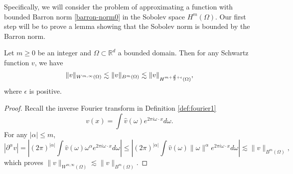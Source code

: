 Specifically, we will consider the problem of approximating a function with bounded Barron norm \eqref{barron-norm0} in the Sobolev space $H^m(\Omega)$. Our first step will be to prove a lemma showing that the Sobolev norm is bounded by the Barron norm.

\begin{lemma}\label{smoothness-lemma}
 Let $m \geq 0$ be an integer and $\Omega\subset \mathbb{R}^d$ a bounded domain. Then for any Schwartz function $v$, we have
 \begin{equation}\label{embend}
 \|v\|_{W^{m,\infty}(\Omega)} \lesssim \|v\|_{{B}^m(\Omega)} \lesssim  \|v\|_{H^{m + {d\over 2}+\epsilon}(\Omega)},
 \end{equation}
 where $\epsilon$ is positive.
\end{lemma}
\begin{proof}
Recall the inverse Fourier transform in Definition \ref{def:fourier1}
$$
v(x)=\int \hat{v}(\omega) e^{2 \pi i\omega \cdot x} d \omega.
$$
For any $|\alpha|\le m$,
$$
|\partial^\alpha v|=|(2\pi)^{|\alpha|}\int \hat{v}(\omega) \omega^\alpha e^{2 \pi i\omega \cdot x} d \omega|\le |(2\pi)^{|\alpha|}\int \hat{v}(\omega) \|\omega\|^\alpha e^{2 \pi i\omega \cdot x} d \omega| \lesssim \|v\|_{B^m(\Omega)},
$$ 
which proves $ \|v\|_{W^{m,\infty}(\Omega)} \lesssim \|v\|_{{B}^m(\Omega)}$.

\iffalse
 Let $\chi$ be a Schwartz function satisfying $\chi(x) = 1$ for $x\in \Omega$. Such a function exists because $\Omega$ is bounded. Let $\alpha$ be any multi-index with $|\alpha|\leq m$. Then we have
 \begin{equation}
  \|D^\alpha v\|_{L^2(\Omega)} \leq \|\chi D^\alpha u\|_{L^2(\mathbb{R}^d)} \leq \|\hat\chi * \widehat{D^\alpha v}\|_{L^2(\mathbb{R}^d)}
 \end{equation}
 Now we use Young's inequality to obtain
 \begin{equation}
  \|\hat\chi * \widehat{D^\alpha v}\|_{L^2(\mathbb{R}^d)} \leq \|\hat\chi\|_{L^2(\mathbb{R}^d)}\|\widehat{D^\alpha v}\|_{L^1(\mathbb{R}^d)} \leq \|\hat\chi\|_{L^2(\mathbb{R}^d)}\|v\|_{\mathcal{B}^m(\Omega)}.
 \end{equation}
 Combining this over all multi-indices $\alpha$, we get
 \begin{equation}
  \|u\|_{H^m(\Omega)} \lesssim \|v\|_{\mathcal{B}^m(\Omega)},
 \end{equation}
 as desired. \fi
 

\end{proof}
